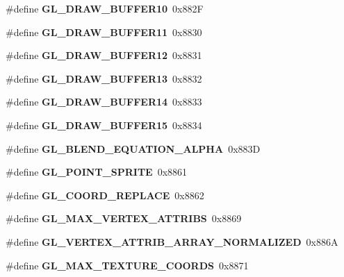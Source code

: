 \begin{DoxyCompactItemize}
\item 
\#define {\bfseries G\+L\+\_\+\+D\+R\+A\+W\+\_\+\+B\+U\+F\+F\+E\+R10}~0x882\+F\label{_s_d_l__opengl_8h_a442e587e94fbac12a5295a511215183e}

\item 
\#define {\bfseries G\+L\+\_\+\+D\+R\+A\+W\+\_\+\+B\+U\+F\+F\+E\+R11}~0x8830\label{_s_d_l__opengl_8h_a3dff209c91c5e127ec86e459ca6ad46a}

\item 
\#define {\bfseries G\+L\+\_\+\+D\+R\+A\+W\+\_\+\+B\+U\+F\+F\+E\+R12}~0x8831\label{_s_d_l__opengl_8h_a061a16dbc7b68f091e1903067b929067}

\item 
\#define {\bfseries G\+L\+\_\+\+D\+R\+A\+W\+\_\+\+B\+U\+F\+F\+E\+R13}~0x8832\label{_s_d_l__opengl_8h_abdbe6e924fa1252fbd9d67e292d4b93e}

\item 
\#define {\bfseries G\+L\+\_\+\+D\+R\+A\+W\+\_\+\+B\+U\+F\+F\+E\+R14}~0x8833\label{_s_d_l__opengl_8h_a819521c69534374257cebeb5e2025d55}

\item 
\#define {\bfseries G\+L\+\_\+\+D\+R\+A\+W\+\_\+\+B\+U\+F\+F\+E\+R15}~0x8834\label{_s_d_l__opengl_8h_a46467585334deca0ddc280cfdff4965e}

\item 
\#define {\bfseries G\+L\+\_\+\+B\+L\+E\+N\+D\+\_\+\+E\+Q\+U\+A\+T\+I\+O\+N\+\_\+\+A\+L\+P\+H\+A}~0x883\+D\label{_s_d_l__opengl_8h_a85a60a922c2e2abe0838e20bbcc7dbf2}

\item 
\#define {\bfseries G\+L\+\_\+\+P\+O\+I\+N\+T\+\_\+\+S\+P\+R\+I\+T\+E}~0x8861\label{_s_d_l__opengl_8h_aa9c2d29fbaccd5badfc18959375c7d74}

\item 
\#define {\bfseries G\+L\+\_\+\+C\+O\+O\+R\+D\+\_\+\+R\+E\+P\+L\+A\+C\+E}~0x8862\label{_s_d_l__opengl_8h_a629de8cb4586f47cc1fb687961b98dd3}

\item 
\#define {\bfseries G\+L\+\_\+\+M\+A\+X\+\_\+\+V\+E\+R\+T\+E\+X\+\_\+\+A\+T\+T\+R\+I\+B\+S}~0x8869\label{_s_d_l__opengl_8h_a676ebaa9cbb5d801e916cc8f0c245f44}

\item 
\#define {\bfseries G\+L\+\_\+\+V\+E\+R\+T\+E\+X\+\_\+\+A\+T\+T\+R\+I\+B\+\_\+\+A\+R\+R\+A\+Y\+\_\+\+N\+O\+R\+M\+A\+L\+I\+Z\+E\+D}~0x886\+A\label{_s_d_l__opengl_8h_a27329f794ceb87696a167be875ce7fc8}

\item 
\#define {\bfseries G\+L\+\_\+\+M\+A\+X\+\_\+\+T\+E\+X\+T\+U\+R\+E\+\_\+\+C\+O\+O\+R\+D\+S}~0x8871\label{_s_d_l__opengl_8h_a947620859e913f928cd74a082ad9ed29}


\end{DoxyCompactItemize}
